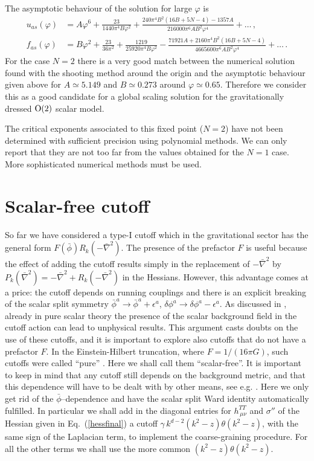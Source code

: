 \documentclass[11pt]{book} %
\newcommand{\bnabla}{\bar\nabla}
\begin{document}
The asymptotic behaviour of the solution
for large $\varphi$ is
\begin{align}
  u_{as}(\varphi) &= A \varphi ^6 + \frac{23}{1440 \pi ^4 B \varphi ^2}
                     + \frac{240 \pi ^4 B^2 (16 B+5 N-4)-1357 A}{216000 \pi ^6 A B^2 \varphi ^4} + \dots \,, \\
  f_{as}(\varphi) &= B \varphi ^2 + \frac{23}{36 \pi ^2}+\frac{1219}{25920 \pi ^4 B \varphi ^2}
                     - \frac{71921 A+2160 \pi ^4 B^2 (16 B+5 N-4)}{4665600 \pi ^6 A B^2 \varphi ^4} + \dots \,.
\end{align}
For the case $N=2$ there is a very good match between the numerical solution
found with the shooting method around the origin
and the asymptotic behaviour given above for $A\simeq 5.149$ and $B\simeq 0.273$ around $\varphi\simeq0.65$.
Therefore we consider this as a good candidate for
a global scaling solution for the gravitationally
dressed ${\rm O(2)}$ scalar model.

The critical exponents associated to this fixed point ($N=2$) have not been determined with
sufficient precision using polynomial methods.
We can only report that they are not too far from the values obtained for the $N=1$ case.
More sophisticated numerical methods must be used.


\section{Scalar-free cutoff}

So far we have considered a type-I cutoff which in the gravitational
sector has the general form $F(\bar\phi)R_k(-\bnabla^2)$.
The presence of the prefactor $F$ is useful because the effect
of adding the cutoff results simply in the replacement of
$-\bnabla^2$ by $P_k(\bnabla^2)=-\bnabla^2+R_k(-\bnabla^2)$
in the Hessians.
However, this advantage comes at a price:
the cutoff depends on running couplings
and there is an explicit breaking of the scalar split symmetry
$\bar\phi^a\to\bar\phi^a+\epsilon^a$,
$\delta\phi^a\to\delta\phi^a-\epsilon^a$.
As discussed in \cite{Bridle:2013sra}, already in pure scalar theory
the presence of the scalar background field
in the cutoff action can lead to unphysical results.
This argument casts doubts on the use of these cutoffs,
and it is important to explore also cutoffs that
do not have a prefactor $F$.
In the Einstein-Hilbert truncation, where $F=1/(16\pi G)$,
such cutoffs were called ``pure'' \cite{Narain:2009qa}.
Here we shall call them ``scalar-free''.
It is important to keep in mind that any cutoff still
depends on the background metric, and that this dependence will
have to be dealt with by other means, see e.g. \cite{Dietz:2015owa,Becker:2014qya}.
Here we only get rid of the $\bar\phi$--dependence and have the scalar split Ward
identity automatically fulfilled.
In particular we shall add in the diagonal entries for $h^{TT}_{\,\mu\nu}$
and $\sigma''$ of the Hessian given in Eq.~(\ref{hessfinal})  a cutoff $\gamma\, k^{d-2}(k^2-z)\theta(k^2-z)$,
with the same sign of the Laplacian term, to implement the coarse-graining procedure.
For all the other terms we shall use the more common
$(k^2-z)\theta(k^2-z)$.
\end{document}
